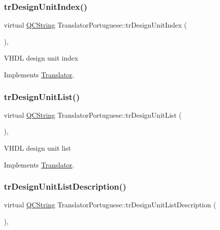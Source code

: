 \subsubsection{\texorpdfstring{trDesignUnitIndex()}{trDesignUnitIndex()}}
{\footnotesize\ttfamily virtual \mbox{\hyperlink{class_q_c_string}{Q\+C\+String}} Translator\+Portuguese\+::tr\+Design\+Unit\+Index (\begin{DoxyParamCaption}{ }\end{DoxyParamCaption})\hspace{0.3cm}{\ttfamily [inline]}, {\ttfamily [virtual]}}

V\+H\+DL design unit index 

Implements \mbox{\hyperlink{class_translator}{Translator}}.

\mbox{\label{class_translator_portuguese_a25df884d1e395c824de2d2b4f63418bb}} 
\subsubsection{\texorpdfstring{trDesignUnitList()}{trDesignUnitList()}}
{\footnotesize\ttfamily virtual \mbox{\hyperlink{class_q_c_string}{Q\+C\+String}} Translator\+Portuguese\+::tr\+Design\+Unit\+List (\begin{DoxyParamCaption}{ }\end{DoxyParamCaption})\hspace{0.3cm}{\ttfamily [inline]}, {\ttfamily [virtual]}}

V\+H\+DL design unit list 

Implements \mbox{\hyperlink{class_translator}{Translator}}.

\mbox{\label{class_translator_portuguese_ad554784bb827f5670ed142f43de26108}} 
\subsubsection{\texorpdfstring{trDesignUnitListDescription()}{trDesignUnitListDescription()}}
{\footnotesize\ttfamily virtual \mbox{\hyperlink{class_q_c_string}{Q\+C\+String}} Translator\+Portuguese\+::tr\+Design\+Unit\+List\+Description (\begin{DoxyParamCaption}{ }\end{DoxyParamCaption})\hspace{0.3cm}{\ttfamily [inline]}, {\ttfamily [virtual]}}

